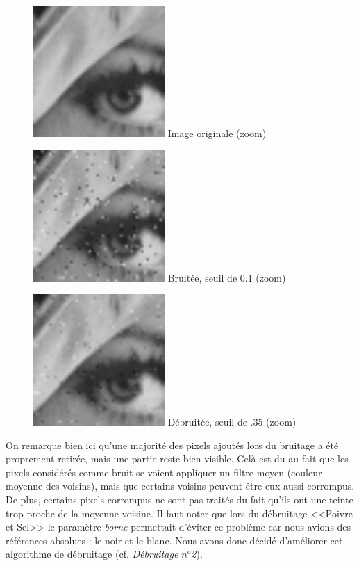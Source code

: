 \documentclass{article}
\begin{document}
		\begin{figure}[!ht]
			\centering
			\begin{minipage}[t]{5cm}
				\centering
				\includegraphics[width=5cm,height=5cm]{lenaZOOM.jpg}
				Image originale (zoom)
			\end{minipage}
			\begin{minipage}[t]{5cm}
				\centering
				\includegraphics[width=5cm,height=5cm]{Additive/algo1_10_ZOOM.jpg}
				Bruitée, seuil de 0.1 (zoom)
			\end{minipage}
			\begin{minipage}[t]{5cm}
				\centering
				\includegraphics[width=5cm,height=5cm]{Additive/unset_algo1_10_ZOOM.jpg}
				Débruitée, seuil de .35 (zoom)
			\end{minipage}
		\end{figure}
		On remarque bien ici qu'une majorité des pixels ajoutés lors du bruitage a été proprement retirée, mais une partie reste bien visible. Celà est du au fait que les pixels considérés comme bruit se voient appliquer un filtre moyen (couleur moyenne des voisins), mais que certains voisins peuvent être eux-aussi corrompus. De plus, certains pixels corrompus ne sont pas traités du fait qu'ils ont une teinte trop proche de la moyenne voisine. Il faut noter que lors du débruitage <<Poivre et Sel>> le paramètre \emph{borne} permettait d'éviter ce problème car nous avions des références absolues : le noir et le blanc. Nous avons donc décidé d'améliorer cet algorithme de débruitage (cf. \emph{Débruitage \begin{math}n^o\end{math}2}).
	
	
\end{document}
